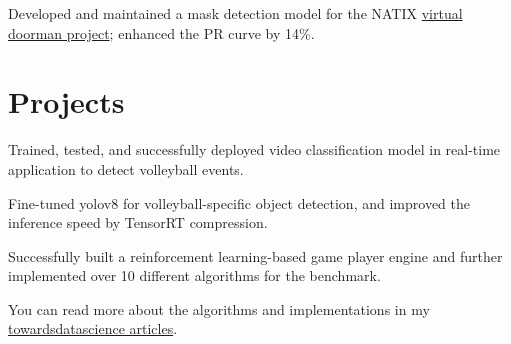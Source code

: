 \documentclass[]{deedy-resume-reversed}
\begin{document}
\begin{minipage}[t]{0.60\textwidth}
\begin{tightemize}
\end{tightemize}
\sectionsep

\begin{tightemize}
\item Developed and maintained a mask detection model for the NATIX \href{https://medium.com/natix-io/introducing-natix-virtual-doorman-af378e2c3803}{virtual doorman project}; enhanced the PR curve by 14\%.
\end{tightemize}
\sectionsep


\section{Projects}
\begin{tightemize}
\item Trained, tested, and successfully deployed video classification model in real-time application to detect volleyball events. 
\item Fine-tuned yolov8 for volleyball-specific object detection, and improved the inference speed by TensorRT compression.
\end{tightemize}
\sectionsep

\begin{tightemize}
\item Successfully built a reinforcement learning-based game player engine and further implemented over 10 different algorithms for the benchmark.
\item You can read more about the algorithms and implementations in my \href{https://towardsdatascience.com/monte-carlo-tree-search-implementing-reinforcement-learning-in-real-time-game-player-a9c412ebeff5}{towardsdatascience articles}.
\end{tightemize}
\sectionsep




\end{minipage}
\end{document}
